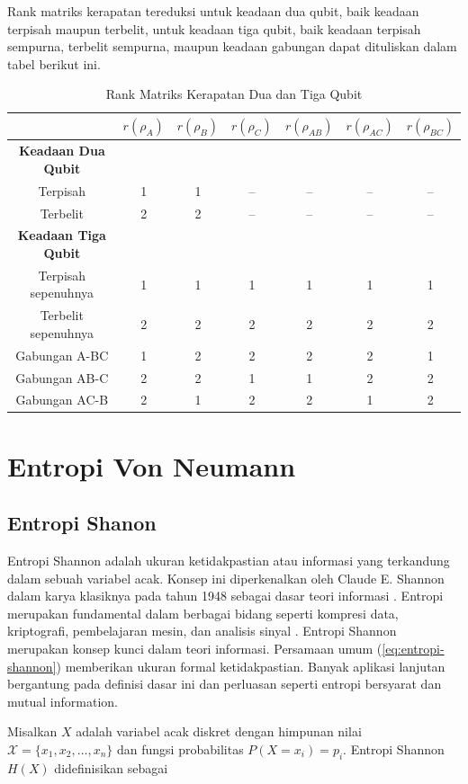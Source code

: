 \par
Rank matriks kerapatan tereduksi untuk keadaan dua qubit, baik keadaan terpisah maupun terbelit, untuk keadaan tiga qubit, baik keadaan terpisah sempurna, terbelit sempurna, maupun keadaan gabungan dapat dituliskan dalam tabel berikut ini.
\newpage
\begin{table}[h]
\centering
\caption{Rank Matriks Kerapatan Dua dan Tiga Qubit}
\begin{tabular}{|c|c|c|c|c|c|c|}
\hline
 & $r(\rho_A)$ & $r(\rho_B)$ & $r(\rho_C)$ & $r(\rho_{AB})$ & $r(\rho_{AC})$ & $r(\rho_{BC})$ \\
\hline
\textbf{Keadaan Dua Qubit} & & & & & & \\
\hline
Terpisah & 1 & 1 & -- & -- & -- & -- \\
\hline
Terbelit & 2 & 2 & -- & -- & -- & -- \\
\hline
\textbf{Keadaan Tiga Qubit} & & & & & & \\
\hline
Terpisah sepenuhnya & 1 & 1 & 1 & 1 & 1 & 1 \\
\hline
Terbelit sepenuhnya & 2 & 2 & 2 & 2 & 2 & 2 \\
\hline
Gabungan A-BC & 1 & 2 & 2 & 2 & 2 & 1 \\
\hline
Gabungan AB-C & 2 & 2 & 1 & 1 & 2 & 2 \\
\hline
Gabungan AC-B & 2 & 1 & 2 & 2 & 1 & 2 \\
\hline
\end{tabular}
\end{table}

\section{Entropi Von Neumann}
\par

\subsection{Entropi Shanon}
\par
Entropi Shannon adalah ukuran ketidakpastian atau informasi yang terkandung dalam sebuah variabel acak. Konsep ini diperkenalkan oleh Claude E. Shannon dalam karya klasiknya pada tahun 1948 sebagai dasar teori informasi \cite{shannon1948mathematical}. Entropi merupakan fundamental dalam berbagai bidang seperti kompresi data, kriptografi, pembelajaran mesin, dan analisis sinyal \cite{cover2006elements}. Entropi Shannon merupakan konsep kunci dalam teori informasi. Persamaan umum (\ref{eq:entropi-shannon}) memberikan ukuran formal ketidakpastian. Banyak aplikasi lanjutan bergantung pada definisi dasar ini dan perluasan seperti entropi bersyarat dan mutual information.
\par
Misalkan \(X\) adalah variabel acak diskret dengan himpunan nilai \(\mathcal{X} = \{x_1, x_2, \ldots, x_n\}\) dan fungsi probabilitas \(P(X=x_i)=p_i\). Entropi Shannon \(H(X)\) didefinisikan sebagai

